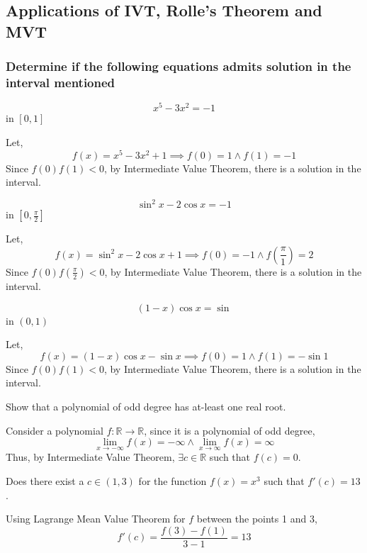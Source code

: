 \subsection{Applications of IVT, Rolle's Theorem and MVT}
\subsubsection{Determine if the following equations admits solution in the interval mentioned}
\begin{asign}
	\[x^5-3x^2=-1\]
	in $[0,1]$
\end{asign}
\begin{anse}
	Let,
	\[f(x)=x^5-3x^2+1\implies f(0)=1\land f(1)=-1\]
	Since $f(0)f(1)<0$, by Intermediate Value Theorem, there is a solution in the interval.
\end{anse}
\begin{asign}
	\[\sin^2x-2\cos x=-1\]
	in $[0,\frac{\pi}{2}]$
\end{asign}
\begin{anse}
	Let,
	\[f(x)=\sin^2x-2\cos x+1 \implies f(0)=-1 \land f(\frac{\pi}{1})=2\]
	Since $f(0)f(\frac{\pi}{2})<0$, by Intermediate Value Theorem, there is a solution in the interval.
\end{anse}
\begin{asign}
	\[(1-x)\cos x=\sin \]
	in $(0,1)$
\end{asign}
\begin{anse}
	Let,
	\[f(x)=(1-x)\cos x-\sin x\implies f(0)=1 \land f(1)=-\sin 1\]
	Since $f(0)f(1)<0$, by Intermediate Value Theorem, there is a solution in the interval.
\end{anse}
\begin{asign}
	Show that a polynomial of odd degree has at-least one real root.
\end{asign}
\begin{anse}
	Consider a polynomial $f:\mathbb{R}\to \mathbb{R}$, since it is a polynomial of odd degree,
	\[\lim\limits_{x\to-\infty}f(x)=-\infty \land \lim\limits_{x\to\infty}f(x)=\infty \]
	Thus, by Intermediate Value Theorem, $\exists c\in\mathbb{R}$ such that $f(c)=0$.
\end{anse}
\begin{asign}
	Does there exist a $c\in (1,3)$ for the function $f(x)=x^3$ such that $f'(c)=13$.
\end{asign}
\begin{anse}
	Using Lagrange Mean Value Theorem for $f$ between the points 1 and 3,
	\[f'(c)=\frac{f(3)-f(1)}{3-1}=13\]
\end{anse}
